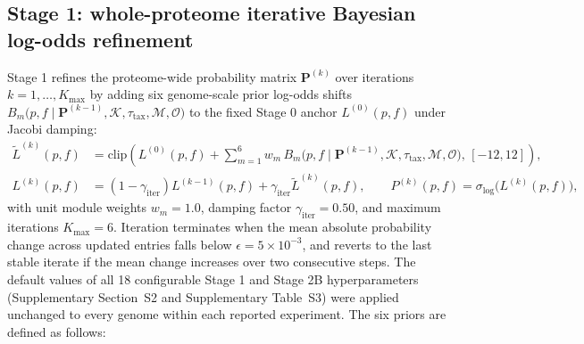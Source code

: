 \documentclass[10pt,twocolumn]{article}
\begin{document}
\subsection{Stage 1: whole-proteome iterative Bayesian log-odds refinement}

Stage 1 refines the proteome-wide probability matrix $\mathbf{P}^{(k)}$ over iterations $k = 1, \dots, K_{\max}$ by adding six genome-scale prior log-odds shifts $B_m\bigl(p, f \mid \mathbf{P}^{(k-1)}, \mathcal{K}, \tau_{\text{tax}}, \mathcal{M}, \mathcal{O}\bigr)$ to the fixed Stage 0 anchor $L^{(0)}(p, f)$ under Jacobi damping:
\begin{equation}
  \begin{aligned}
    \tilde{L}^{(k)}(p, f) &= \text{clip}\!\left(L^{(0)}(p, f) + \sum_{m=1}^{6} w_m \, B_m\bigl(p, f \mid \mathbf{P}^{(k-1)}, \mathcal{K}, \tau_{\text{tax}}, \mathcal{M}, \mathcal{O}\bigr), \, [-12, 12]\right), \\
    L^{(k)}(p, f) &= (1 - \gamma_{\text{iter}}) L^{(k-1)}(p, f) + \gamma_{\text{iter}} \tilde{L}^{(k)}(p, f), \qquad P^{(k)}(p, f) = \sigma_{\text{log}}\bigl(L^{(k)}(p, f)\bigr),
  \end{aligned}
  \label{eq:stage1}
\end{equation}
with unit module weights $w_m = 1.0$, damping factor $\gamma_{\text{iter}} = 0.50$, and maximum iterations $K_{\max} = 6$. Iteration terminates when the mean absolute probability change across updated entries falls below $\epsilon = 5 \times 10^{-3}$, and reverts to the last stable iterate if the mean change increases over two consecutive steps. The default values of all 18 configurable Stage 1 and Stage 2B hyperparameters (Supplementary Section~S2 and Supplementary Table~S3) were applied unchanged to every genome within each reported experiment. The six priors are defined as follows:
\end{document}
